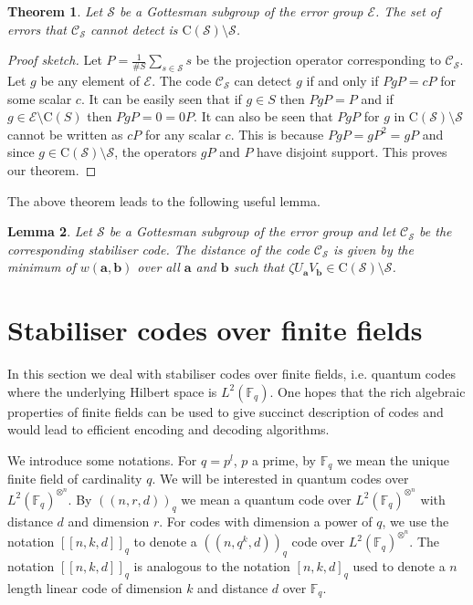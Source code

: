 \documentclass[11pt,twoside]{article}
\newtheorem{theorem}{Theorem}[section]
\newtheorem{lemma}[theorem]{Lemma}
\theoremstyle{definition}
\theoremstyle{remark}
\newcommand{\Weight}[1]{\ensuremath{w\left(#1\right)}}
\newcommand{\LN}[1]{\ensuremath{L^2\left(#1\right)^{\otimes^n}}}
\newcommand{\Centre}[1]{\ensuremath{\mathrm{C}\left(#1\right)}}
\newcommand{\GF}[0]{\ensuremath{\mathbb{F}}}
\begin{document}
\begin{theorem}
  Let $\mathcal{S}$ be a Gottesman subgroup of the error group
  $\mathcal{E}$. The set of errors that $\mathcal{C}_\mathcal{S}$
  cannot detect is $\Centre{\mathcal{S}} \setminus \mathcal{S}$.
\end{theorem}
\begin{proof}[Proof sketch]
  Let $P = \frac{1}{\# S} \sum_{s \in \mathcal{S}} s$ be the
  projection operator corresponding to $\mathcal{C}_\mathcal{S}$. Let
  $g$ be any element of $\mathcal{E}$.  The code
  $\mathcal{C}_\mathcal{S}$ can detect $g$ if and only if $PgP = c P$
  for some scalar $c$. It can be easily seen that if $g \in S$ then
  $PgP = P$ and if $g \in \mathcal{E} \setminus \Centre{S}$ then $P g
  P = 0 = 0 P$. It can also be seen that $P g P$ for $g$ in
  $\Centre{\mathcal{S}} \setminus \mathcal{S}$ cannot be written as $c
  P$ for any scalar $c$. This is because $P g P = g P^2 = g P$ and
  since $g \in \Centre{\mathcal{S}} \setminus \mathcal{S}$, the
  operators $g P$ and $P$ have disjoint support. This proves our
  theorem.
\end{proof}

The above theorem leads to the following useful lemma.

\begin{lemma}
  Let $\mathcal{S}$ be a Gottesman subgroup of the error group and let
  $\mathcal{C}_\mathcal{S}$ be the corresponding stabiliser code. The
  distance of the code $\mathcal{C}_\mathcal{S}$ is given by the
  minimum of $\Weight{\mathbf{a},\mathbf{b}}$ over all $\mathbf{a}$
  and $\mathbf{b}$ such that $\zeta U_\mathbf{a} V_\mathbf{b} \in
  \Centre{\mathcal{S}} \setminus \mathcal{S}$.
\end{lemma}

\section{Stabiliser codes over finite fields}

In this section we deal with stabiliser codes over finite fields, i.e.
quantum codes where the underlying Hilbert space is $L^2(\GF_q)$. One
hopes that the rich algebraic properties of finite fields can be used
to give succinct description of codes and would lead to efficient
encoding and decoding algorithms.

We introduce some notations. For $q = p^l$, $p$ a prime, by $\GF_q$ we
mean the unique finite field of cardinality $q$.  We will be
interested in quantum codes over $\LN{\GF_q}$. By $((n,r,d))_q$ we
mean a quantum code over $\LN{\GF_q}$ with distance $d$ and dimension
$r$. For codes with dimension a power of $q$, we use the notation
$[[n,k,d]]_q$ to denote a $((n,q^k,d))_q$ code over $\LN{\GF_q}$. The
notation $[[n,k,d]]_q$ is analogous to the notation $[n,k,d]_q$ used
to denote a $n$ length linear code of dimension $k$ and distance $d$
over $\GF_q$.
\end{document}
